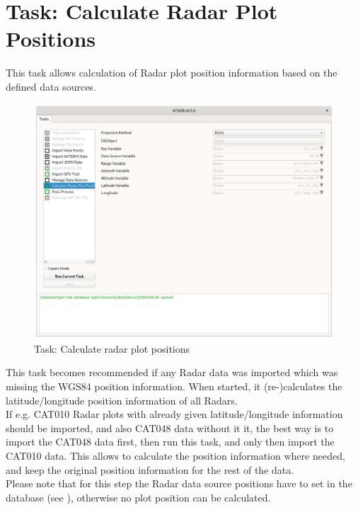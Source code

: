 \section{Task: Calculate Radar Plot Positions}
\label{sec:task_calc_radar_pos}

This task allows calculation of Radar plot position information based on the defined data sources.

\begin{figure}[H]
  \hspace*{-2.5cm}
    \includegraphics[width=19cm]{figures/task_calc_radar.png}
  \caption{Task: Calculate radar plot positions}
  \label{fig:task_calc_radar}
\end{figure}

This task becomes recommended if any Radar data was imported which was missing the WGS84 position information. When started, it (re-)calculates the latitude/longitude position information of all Radars. \\

If e.g. CAT010 Radar plots with already given latitude/longitude information should be imported, and also CAT048 data without it it, the best way is to import the CAT048 data first, then run this task, and only then import the CAT010 data. This allows to calculate the position information where needed, and keep the original position information for the rest of the data. \\


Please note that for this step the Radar data source positions have to set in the database (see ), otherwise no plot position can be calculated.  \\

